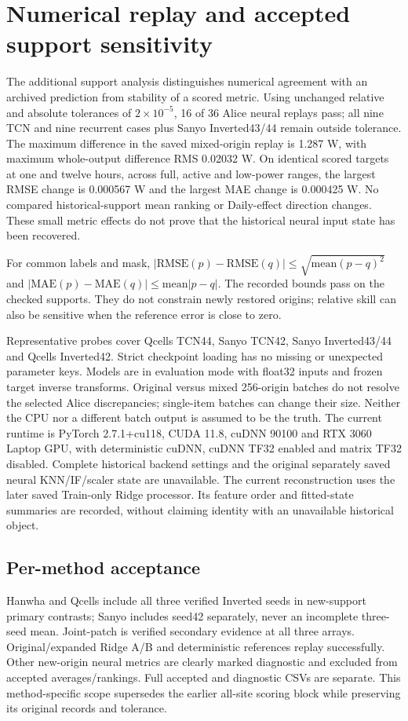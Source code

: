 \section{Numerical replay and accepted support sensitivity}
The additional support analysis distinguishes numerical agreement with an archived prediction from stability of a scored metric. Using unchanged relative and absolute tolerances of $2\times10^{-5}$, 16 of 36 Alice neural replays pass; all nine TCN and nine recurrent cases plus Sanyo Inverted43/44 remain outside tolerance. The maximum difference in the saved mixed-origin replay is 1.287 W, with maximum whole-output difference RMS 0.02032 W. On identical scored targets at one and twelve hours, across full, active and low-power ranges, the largest RMSE change is 0.000567 W and the largest MAE change is 0.000425 W. No compared historical-support mean ranking or Daily-effect direction changes. These small metric effects do not prove that the historical neural input state has been recovered.

For common labels and mask, $|\mathrm{RMSE}(p)-\mathrm{RMSE}(q)|\leq\sqrt{\mathrm{mean}(p-q)^2}$ and $|\mathrm{MAE}(p)-\mathrm{MAE}(q)|\leq\mathrm{mean}|p-q|$. The recorded bounds pass on the checked supports. They do not constrain newly restored origins; relative skill can also be sensitive when the reference error is close to zero.

Representative probes cover Qcells TCN44, Sanyo TCN42, Sanyo Inverted43/44 and Qcells Inverted42. Strict checkpoint loading has no missing or unexpected parameter keys. Models are in evaluation mode with float32 inputs and frozen target inverse transforms. Original versus mixed 256-origin batches do not resolve the selected Alice discrepancies; single-item batches can change their size. Neither the CPU nor a different batch output is assumed to be the truth. The current runtime is PyTorch 2.7.1+cu118, CUDA 11.8, cuDNN 90100 and RTX 3060 Laptop GPU, with deterministic cuDNN, cuDNN TF32 enabled and matrix TF32 disabled. Complete historical backend settings and the original separately saved neural KNN/IF/scaler state are unavailable. The current reconstruction uses the later saved Train-only Ridge processor. Its feature order and fitted-state summaries are recorded, without claiming identity with an unavailable historical object.

\subsection{Per-method acceptance}
Hanwha and Qcells include all three verified Inverted seeds in new-support primary contrasts; Sanyo includes seed42 separately, never an incomplete three-seed mean. Joint-patch is verified secondary evidence at all three arrays. Original/expanded Ridge A/B and deterministic references replay successfully. Other new-origin neural metrics are clearly marked diagnostic and excluded from accepted averages/rankings. Full accepted and diagnostic CSVs are separate. This method-specific scope supersedes the earlier all-site scoring block while preserving its original records and tolerance.

